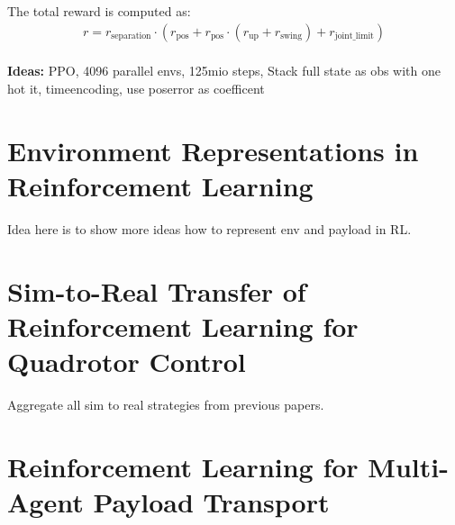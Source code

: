 The total reward is computed as:
\begin{equation}
    \begin{split}
r = r_{\text{separation}} \cdot \left( r_{\text{pos}} + r_{\text{pos}} \cdot (r_{\text{up}} + r_{\text{swing}}) + r_{\text{joint\_limit}} \right)
    \end{split}
\end{equation}
\\
\textbf{Ideas:}
 PPO, 4096 parallel envs, 125mio steps, Stack full state as obs with one hot it, timeencoding, use poserror as coefficent\\


\section{Environment Representations in Reinforcement Learning}
Idea here is to show more ideas how to represent env and payload in RL.
\section{Sim-to-Real Transfer of Reinforcement Learning for Quadrotor Control} 
Aggregate all sim to real strategies from previous papers.\\
\section{Reinforcement Learning for Multi-Agent Payload Transport}
